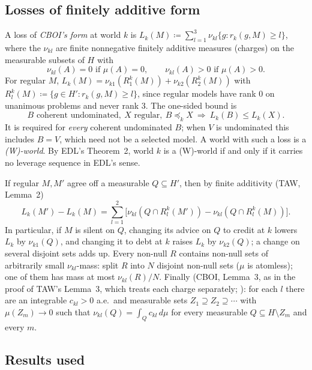 \documentclass[11pt]{article}
\theoremstyle{definition}\newtheorem{definition}[theorem]{Definition}
\theoremstyle{remark}\newtheorem{remark}[theorem]{Remark}
\begin{document}
\subsection{Losses of finitely additive form}\label{sec:losses}

A loss of \emph{CBOI's form} at world $k$ is $L_k(M)\coloneqq
\sum_{l=1}^3\nu_{kl}\{g:r_k(g,M)\ge l\}$, where the $\nu_{kl}$ are finite
nonnegative finitely additive measures (charges) on the measurable subsets
of $H$ with
\begin{equation}
 \nu_{kl}(A)=0\text{ if }\mu(A)=0,\qquad\nu_{kl}(A)>0\text{ if }\mu(A)>0.
 \label{eq:positive}
\end{equation}
For regular $M$, $L_k(M)=\nu_{k1}(R^k_1(M))+\nu_{k2}(R^k_2(M))$ with
$R^k_l(M)\coloneqq\{g\in H':r_k(g,M)\ge l\}$, since regular models have rank
$0$ on unanimous problems and never rank $3$. The one-sided bound is
\begin{equation}
 B\text{ coherent undominated},\ X\text{ regular},\ B\preceq_kX
 \ \Longrightarrow\ L_k(B)\le L_k(X).
 \tag{W$_k$}\label{eq:W}
\end{equation}
It is required for \emph{every} coherent undominated $B$; when $V$ is
undominated this includes $B=V$, which need not be a selected model. A world
with such a loss is a \emph{(W)-world}. By EDL's Theorem~2, world $k$ is a
(W)-world if and only if it carries no leverage sequence in EDL's sense.

If regular $M,M'$ agree off a measurable $Q\subseteq H'$, then by finite
additivity (TAW, Lemma~2)
\[
 L_k(M')-L_k(M)=\sum_{l=1}^2\bigl[\nu_{kl}(Q\cap R^k_l(M'))
 -\nu_{kl}(Q\cap R^k_l(M))\bigr].
\]
In particular, if $M$ is silent on $Q$, changing its advice on $Q$ to credit
at $k$ lowers $L_k$ by $\nu_{k1}(Q)$, and changing it to debt at $k$ raises
$L_k$ by $\nu_{k2}(Q)$; a change on several disjoint sets adds up. Every
non-null $R$ contains non-null sets of arbitrarily small $\nu_{kl}$-mass:
split $R$ into $N$ disjoint non-null sets ($\mu$ is atomless); one of them
has mass at most $\nu_{kl}(R)/N$. Finally (CBOI, Lemma~3, as in the proof of
TAW's Lemma~3, which treats each charge separately; \cite{YH}): for each
$l$ there are an integrable $c_{kl}>0$ a.e.\ and measurable sets
$Z_1\supseteq Z_2\supseteq\cdots$ with $\mu(Z_m)\to0$ such that
$\nu_{kl}(Q)=\int_Qc_{kl}\,d\mu$ for every measurable $Q\subseteq
H\setminus Z_m$ and every $m$.

\subsection{Results used}\label{sec:inputs}
\end{document}
